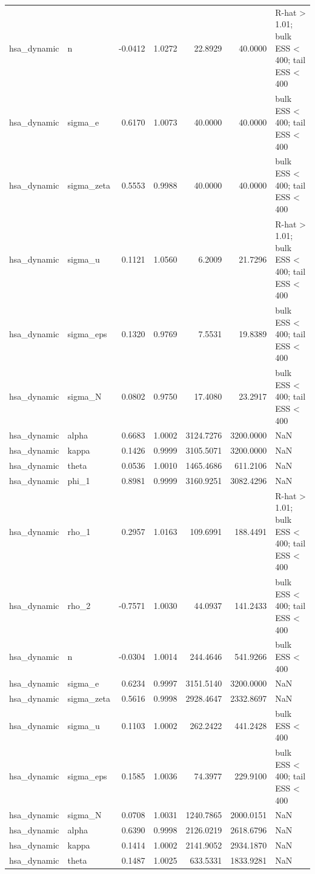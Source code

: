\begin{tabular}{llrrrrl}
hsa\_dynamic & n & -0.0412 & 1.0272 & 22.8929 & 40.0000 & R-hat > 1.01; bulk ESS < 400; tail ESS < 400 \\
hsa\_dynamic & sigma\_e & 0.6170 & 1.0073 & 40.0000 & 40.0000 & bulk ESS < 400; tail ESS < 400 \\
hsa\_dynamic & sigma\_zeta & 0.5553 & 0.9988 & 40.0000 & 40.0000 & bulk ESS < 400; tail ESS < 400 \\
hsa\_dynamic & sigma\_u & 0.1121 & 1.0560 & 6.2009 & 21.7296 & R-hat > 1.01; bulk ESS < 400; tail ESS < 400 \\
hsa\_dynamic & sigma\_eps & 0.1320 & 0.9769 & 7.5531 & 19.8389 & bulk ESS < 400; tail ESS < 400 \\
hsa\_dynamic & sigma\_N & 0.0802 & 0.9750 & 17.4080 & 23.2917 & bulk ESS < 400; tail ESS < 400 \\
hsa\_dynamic & alpha & 0.6683 & 1.0002 & 3124.7276 & 3200.0000 & NaN \\
hsa\_dynamic & kappa & 0.1426 & 0.9999 & 3105.5071 & 3200.0000 & NaN \\
hsa\_dynamic & theta & 0.0536 & 1.0010 & 1465.4686 & 611.2106 & NaN \\
hsa\_dynamic & phi\_1 & 0.8981 & 0.9999 & 3160.9251 & 3082.4296 & NaN \\
hsa\_dynamic & rho\_1 & 0.2957 & 1.0163 & 109.6991 & 188.4491 & R-hat > 1.01; bulk ESS < 400; tail ESS < 400 \\
hsa\_dynamic & rho\_2 & -0.7571 & 1.0030 & 44.0937 & 141.2433 & bulk ESS < 400; tail ESS < 400 \\
hsa\_dynamic & n & -0.0304 & 1.0014 & 244.4646 & 541.9266 & bulk ESS < 400 \\
hsa\_dynamic & sigma\_e & 0.6234 & 0.9997 & 3151.5140 & 3200.0000 & NaN \\
hsa\_dynamic & sigma\_zeta & 0.5616 & 0.9998 & 2928.4647 & 2332.8697 & NaN \\
hsa\_dynamic & sigma\_u & 0.1103 & 1.0002 & 262.2422 & 441.2428 & bulk ESS < 400 \\
hsa\_dynamic & sigma\_eps & 0.1585 & 1.0036 & 74.3977 & 229.9100 & bulk ESS < 400; tail ESS < 400 \\
hsa\_dynamic & sigma\_N & 0.0708 & 1.0031 & 1240.7865 & 2000.0151 & NaN \\
hsa\_dynamic & alpha & 0.6390 & 0.9998 & 2126.0219 & 2618.6796 & NaN \\
hsa\_dynamic & kappa & 0.1414 & 1.0002 & 2141.9052 & 2934.1870 & NaN \\
hsa\_dynamic & theta & 0.1487 & 1.0025 & 633.5331 & 1833.9281 & NaN \\

\end{tabular}
